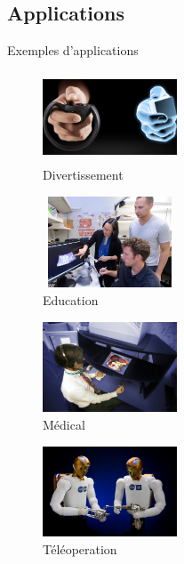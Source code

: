 \documentclass[compress, noflama]{beamer}
\begin{document}
\subsection{Applications}
\begin{frame}{Exemples d'applications}
\begin{multicols}{2}
\begin{figure}
	\centering			
	\includegraphics[width=4cm,height=2.7cm]{images/touch_vr}%
	\caption{Divertissement}
	\end{figure}
		\vspace{-0.7cm}	
	\begin{figure}	
	\includegraphics[width=4cm, height=2.7cm]{images/education}%
	\caption{Education}
	\end{figure}

\begin{figure}
	\centering			
	\includegraphics[width=4cm,height=2.7cm]{images/hapticSurgery}%
	\caption{Médical}
		\end{figure}	
					\vspace{-1.5cm}	
	\begin{figure}
	\includegraphics[width=4cm,height=2.7cm]{images/teleoperation}%
	\caption{Téléoperation}
	\end{figure}
	
\end{multicols}
\end{frame}
\end{document}

